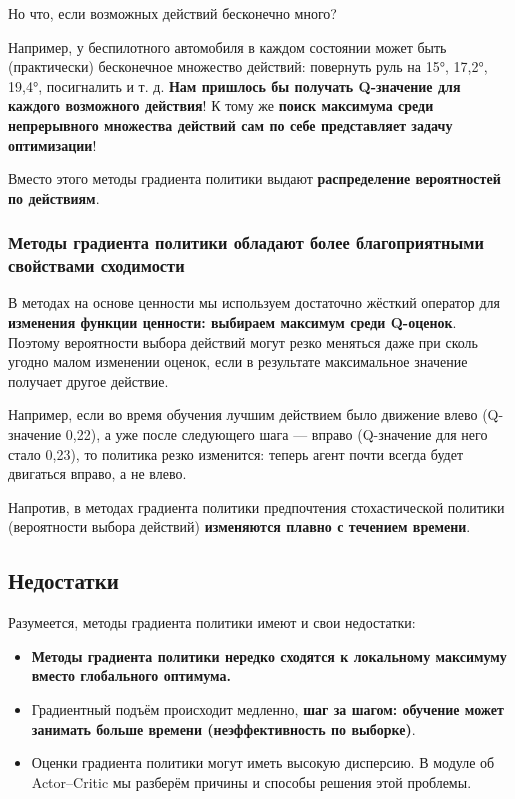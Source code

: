 \documentclass[11pt,a4paper]{article}
\begin{document}
Но что, если возможных действий бесконечно много?

Например, у беспилотного автомобиля в каждом состоянии может быть (практически) бесконечное множество действий: повернуть руль на 15°, 17,2°, 19,4°, посигналить и т. д. \textbf{Нам пришлось бы получать Q-значение для каждого возможного действия}! К тому же \textbf{поиск максимума среди непрерывного множества действий сам по себе представляет задачу оптимизации}!

Вместо этого методы градиента политики выдают \textbf{распределение вероятностей по действиям}.

\subsubsection{Методы градиента политики обладают более благоприятными свойствами сходимости}\label{policy-gradient-methods-have-better-convergence-properties}

В методах на основе ценности мы используем достаточно жёсткий оператор для \textbf{изменения функции ценности: выбираем максимум среди Q-оценок}. Поэтому вероятности выбора действий могут резко меняться даже при сколь угодно малом изменении оценок, если в результате максимальное значение получает другое действие.

Например, если во время обучения лучшим действием было движение влево (Q-значение 0,22), а уже после следующего шага --- вправо (Q-значение для него стало 0,23), то политика резко изменится: теперь агент почти всегда будет двигаться вправо, а не влево.

Напротив, в методах градиента политики предпочтения стохастической политики (вероятности выбора действий) \textbf{изменяются плавно с течением времени}.

\subsection{Недостатки}\label{disadvantages}

Разумеется, методы градиента политики имеют и свои недостатки:

\begin{itemize}
\tightlist
\item
  \textbf{Методы градиента политики нередко сходятся к локальному максимуму вместо глобального оптимума.}
\item
  Градиентный подъём происходит медленно, \textbf{шаг за шагом: обучение может занимать больше времени (неэффективность по выборке)}.
\item
  Оценки градиента политики могут иметь высокую дисперсию. В модуле об Actor--Critic мы разберём причины и способы решения этой проблемы.
\end{itemize}
\end{document}
